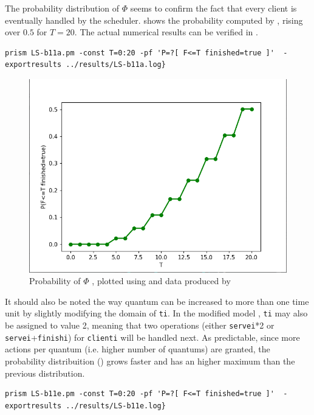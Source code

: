 \documentclass{report}
\begin{document}
The probability distribution of $\Phi$  seems to confirm the fact that every client is eventually handled by the scheduler.  shows the probability computed by , rising over $0.5$ for $T=20$. The actual numerical results can be verified in . 

\begin{lstlisting}[caption=Command to compute probabilities in \Cref{fig:b11c},label={log:b11c}]
  prism LS-b11a.pm -const T=0:20 -pf 'P=?[ F<=T finished=true ]'  -exportresults ../results/LS-b11a.log}
\end{lstlisting}

\begin{figure}[h]
  \begin{center}
    \includegraphics[width=.7\textwidth]{./code/results/b11c.png}
    \caption{Probability of $\Phi$ , plotted using  and data  produced by }
    \label{fig:b11c}
  \end{center}
\end{figure}

It should also be noted the way quantum can be increased to more than one time unit by slightly modifying the domain of \texttt{ti}. In the modified model , \texttt{ti} may also be assigned to value 2, meaning that two operations (either \texttt{servei}*2 or \texttt{servei}+\texttt{finishi}) for \texttt{clienti} will be handled next. As predictable, since more actions per quantum (i.e. higher number of quantums) are granted, the probability distribuition () grows faster and has an higher maximum than the previous distribution.

\begin{lstlisting}[caption=Command to compute probabilities in \Cref{fig:b11e},label={log:b11e}]
  prism LS-b11e.pm -const T=0:20 -pf 'P=?[ F<=T finished=true ]'  -exportresults ../results/LS-b11e.log}
\end{lstlisting}
\end{document}
